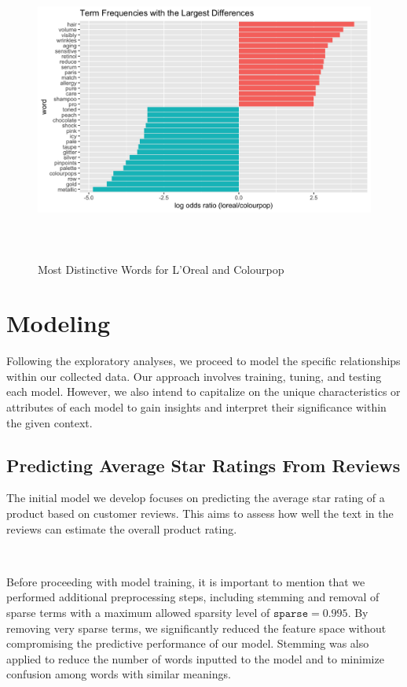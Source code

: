 \documentclass[10pt]{article}
\begin{document}
\begin{figure}[ht!]
    \centering
    \hspace*{-4em}
    \includegraphics[height=100mm, width=130mm]{lorealVScp.png}
    \caption{Most Distinctive Words for L'Oreal and Colourpop}
\end{figure}

\section{Modeling}

Following the exploratory analyses, we proceed to model the specific relationships within our collected data. Our approach involves training, tuning, and testing each model. However, we also intend to capitalize on the unique characteristics or attributes of each model to gain insights and interpret their significance within the given context.

\subsection{Predicting Average Star Ratings From Reviews}

The initial model we develop focuses on predicting the average star rating of a product based on customer reviews. This aims to assess how well the text in the reviews can estimate the overall product rating.

\

Before proceeding with model training, it is important to mention that we performed additional preprocessing steps, including stemming and removal of sparse terms with a maximum allowed sparsity level of $\texttt{sparse}=0.995$. By removing very sparse terms, we significantly reduced the feature space without compromising the predictive performance of our model. Stemming was also applied to reduce the number of words inputted to the model and to minimize confusion among words with similar meanings.
\end{document}
